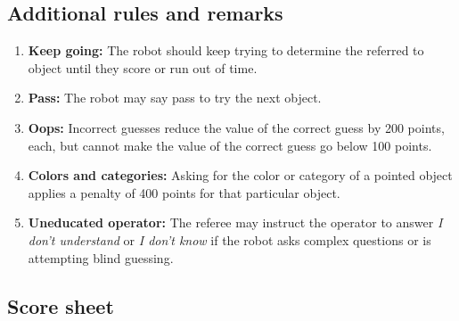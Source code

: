 %
%
\subsection{Additional rules and remarks}
\begin{enumerate}
	\item \textbf{Keep going:} The robot should keep trying to determine the referred to object until they score or run out of time.
	\item \textbf{Pass:} The robot may say pass to try the next object.
	\item \textbf{Oops:} Incorrect guesses reduce the value of the correct guess by 200 points, each, but cannot make the value of the correct guess go below 100 points.
\item\textbf{Colors and categories:} Asking for the color or category of a pointed object applies a penalty of 400 points for that particular object.
\item\textbf{Uneducated operator:} The referee may instruct the operator to answer \emph{I don't understand} or \emph{I don't know} if the robot asks complex questions or is attempting blind guessing.

\end{enumerate}
\newpage
\subsection{Score sheet}


